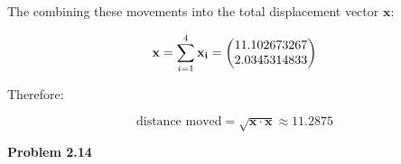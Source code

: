 \documentclass[12pt]{article}
\newenvironment{problem}[1][default]{
  \begin{framed}\begin{minipage}{0.97\textwidth}
  \setlength{\parskip}{4mm}
  {\bf Problem #1}
}{\end{minipage}\end{framed}}
\newcommand\m[2][]{
	\ifthenelse{\equal {#1} {}}
		{\begin{pmatrix*}[r]#2\end{pmatrix*}}
		{\left(\begin{array}{#1}#2\end{array}\right)}
}
\renewcommand{\vec}[1]{\mathbf{#1}}
\begin{document}
The combining these movements into the total displacement vector $\vec{x}$:

\begin{equation}
	\vec{x} = \sum^{4}_{i=1} \vec{x_i} = \m{11.102673267 \\ 2.0345314833}
\end{equation}

Therefore:

\begin{equation}
	\text{distance moved} = \sqrt{\vec{x} \cdot \vec{x}} \approx 11.2875
\end{equation}

\begin{problem}[2.14]

\end{problem}
\end{document}

